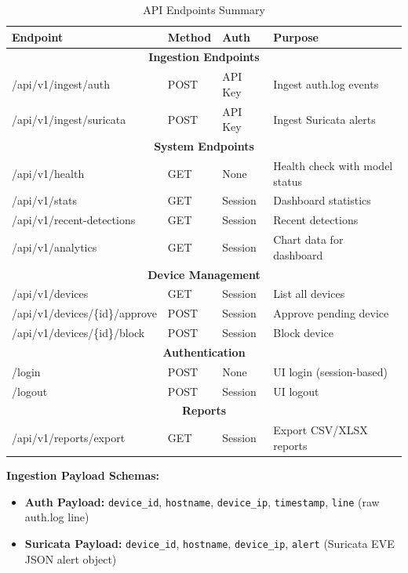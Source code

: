 \documentclass[12pt,a4paper]{report} %
\begin{document}
\begin{table}[H]
	\centering
	\caption{API Endpoints Summary}
	\label{tab:api-endpoints}
	\begin{tabular}{|l|l|l|p{4.5cm}|}
		\hline
		\textbf{Endpoint} & \textbf{Method} & \textbf{Auth} & \textbf{Purpose} \\
		\hline
		\multicolumn{4}{|c|}{\textbf{Ingestion Endpoints}} \\
		\hline
		/api/v1/ingest/auth & POST & API Key & Ingest auth.log events \\
		/api/v1/ingest/suricata & POST & API Key & Ingest Suricata alerts \\
		\hline
		\multicolumn{4}{|c|}{\textbf{System Endpoints}} \\
		\hline
		/api/v1/health & GET & None & Health check with model status \\
		/api/v1/stats & GET & Session & Dashboard statistics \\
		/api/v1/recent-detections & GET & Session & Recent detections \\
		/api/v1/analytics & GET & Session & Chart data for dashboard \\
		\hline
		\multicolumn{4}{|c|}{\textbf{Device Management}} \\
		\hline
		/api/v1/devices & GET & Session & List all devices \\
		/api/v1/devices/\{id\}/approve & POST & Session & Approve pending device \\
		/api/v1/devices/\{id\}/block & POST & Session & Block device \\
		\hline
		\multicolumn{4}{|c|}{\textbf{Authentication}} \\
		\hline
		/login & POST & None & UI login (session-based) \\
		/logout & POST & Session & UI logout \\
		\hline
		\multicolumn{4}{|c|}{\textbf{Reports}} \\
		\hline
		/api/v1/reports/export & GET & Session & Export CSV/XLSX reports \\
		\hline
	\end{tabular}
\end{table}

\textbf{Ingestion Payload Schemas:}
\begin{itemize}
	\item \textbf{Auth Payload:} \texttt{device\_id}, \texttt{hostname}, \texttt{device\_ip}, \texttt{timestamp}, \texttt{line} (raw auth.log line)
	\item \textbf{Suricata Payload:} \texttt{device\_id}, \texttt{hostname}, \texttt{device\_ip}, \texttt{alert} (Suricata EVE JSON alert object)
\end{itemize}
\end{document}
